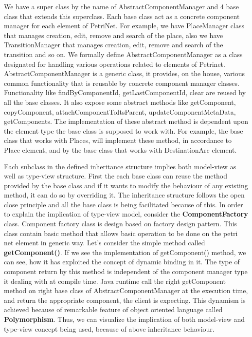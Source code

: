 We  have a super class by the name of AbstractComponentManager and   4  base class that extends this superclass. Each base class act as a concrete component manager for each element of PetriNet. For example, we have PlaceManager class that manages creation, edit, remove and search of the place, also we have TransitionManager that manages creation, edit, remove and search of the transition and so on. We formally define AbstractComponentManager as a class designated for handling various operations related to  elements of Petrinet. AbstractComponentManager is a generic class, it provides, on the house, various common functionality  that is reusable by concrete component manager classes. Functionality like findByComponentId, getLastComponentId, clear are  reused by all the base classes. It also expose some abstract methods like getComponent, copyComponent, attachComponentToItsParent, updateComponentMetaData, getComponents. The implementation of these abstract method is dependent upon the element type the base class is supposed to work with. For example, the base class that works with Places, will implement these method, in accordance to Place element, and by the base class that works with DestinationArc element.

Each subclass in the defined inheritance structure implies both model-view as well as type-view structure.  First the each base class can reuse  the method provided by the base class and if it wants to modify the behaviour of any existing method, it can do so by overriding it. The inheritance structure follows the open close  principle and all the base class is being facilitated because of this.
In order to explain  the implication of  type-view model, consider the {\bf{ComponentFactory}} class.  Component factory class is design based on factory design pattern. This class contain basic method that allows basic operation to be done on the petri net element in  generic way. Let’s consider the simple method called {\bf{getComponent()}}.  If we see the implementation of getComponent() method, we can see, how it has exploited the concept of dynamic binding in it.  The type of component return by this method is independent of the component manager type it  dealing with at compile time. Java runtime call the right getComponent method on right base class of AbstractComponentManager  at the execution time, and return the appropriate  component, the client is expecting. This dynamism is achieved because of remarkable feature of object oriented language called {\bf{Polymorphism}}.  Thus, we can visualize  the implication of both model-view and type-view concept being used, because of above inheritance behaviour. 













